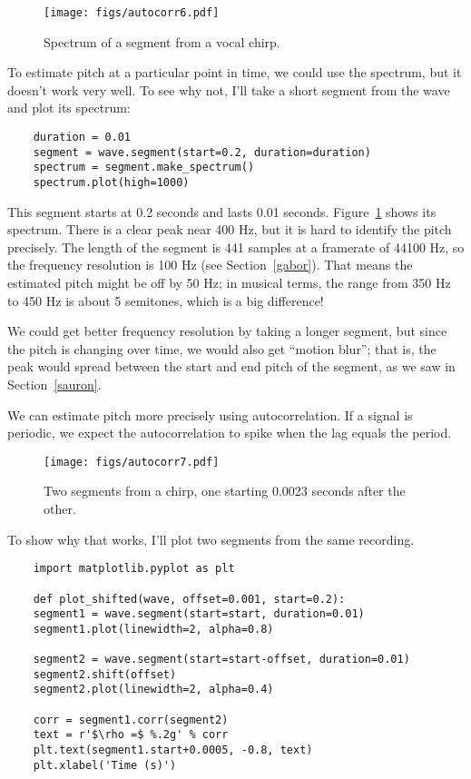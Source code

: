 \begin{figure}
	\centerline{\texttt{[image: figs/autocorr6.pdf]}}
	\caption{Spectrum of a segment from a vocal chirp.}
	\label{fig.autocorr6}
\end{figure}

To estimate pitch at a particular point in time, we could use the
spectrum, but it doesn't work very well.  To see why not, I'll take
a short segment from the wave and plot its spectrum:

\begin{verbatim}
	duration = 0.01
	segment = wave.segment(start=0.2, duration=duration)
	spectrum = segment.make_spectrum()
	spectrum.plot(high=1000)
\end{verbatim}

This segment starts at 0.2 seconds and lasts 0.01 seconds.
Figure~\ref{fig.autocorr6} shows its spectrum.  There is a clear peak
near 400 Hz, but it is hard to identify the pitch precisely.  The
length of the segment is 441 samples at a framerate of 44100 Hz, so
the frequency resolution is 100 Hz (see Section~\ref{gabor}).
That means the estimated pitch might be off by 50 Hz; in musical
terms, the range from 350 Hz to 450 Hz is about 5 semitones, which is
a big difference!

We could get better frequency resolution by taking a longer segment,
but since the pitch is changing over time, we would also get ``motion
blur''; that is, the peak would spread between the start and end pitch of
the segment, as we saw in Section~\ref{sauron}.

We can estimate pitch more precisely using autocorrelation.
If a signal is periodic, we expect the autocorrelation to spike
when the lag equals the period.

\begin{figure}
	\centerline{\texttt{[image: figs/autocorr7.pdf]}}
	\caption{Two segments from a chirp, one starting 0.0023 seconds
		after the other.}
	\label{fig.autocorr7}
\end{figure}

To show why that works, I'll plot two segments from the same
recording.

\begin{verbatim}
	import matplotlib.pyplot as plt
	
	def plot_shifted(wave, offset=0.001, start=0.2):
	segment1 = wave.segment(start=start, duration=0.01)
	segment1.plot(linewidth=2, alpha=0.8)
	
	segment2 = wave.segment(start=start-offset, duration=0.01)
	segment2.shift(offset)
	segment2.plot(linewidth=2, alpha=0.4)
	
	corr = segment1.corr(segment2)
	text = r'$\rho =$ %.2g' % corr
	plt.text(segment1.start+0.0005, -0.8, text)
	plt.xlabel('Time (s)')
\end{verbatim}

